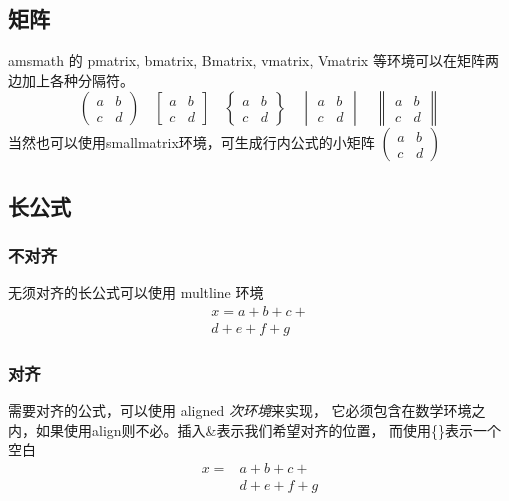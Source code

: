 \subsection{矩阵}
amsmath 的 pmatrix, bmatrix, Bmatrix, vmatrix, Vmatrix 
等环境可以在矩阵两边加上各种分隔符。
\begin{equation*}
\begin{pmatrix} a&b\\c&d \end{pmatrix} \quad
\begin{bmatrix} a&b\\c&d \end{bmatrix} \quad
\begin{Bmatrix} a&b\\c&d \end{Bmatrix} \quad
\begin{vmatrix} a&b\\c&d \end{vmatrix} \quad
\begin{Vmatrix} a&b\\c&d \end{Vmatrix}
\end{equation*}
当然也可以使用smallmatrix环境，可生成行内公式的小矩阵
$ ( \begin{smallmatrix} a&b\\c&d \end{smallmatrix} ) $
\subsection{长公式}
\subsubsection{不对齐}
无须对齐的长公式可以使用 multline 环境
\begin{multline*}
    x = a+b+c+{} \\
    d+e+f+g
\end{multline*}
\subsubsection{对齐}
需要对齐的公式，可以使用 aligned \textit{次环境}来实现，
它必须包含在数学环境之内，如果使用align则不必。插入\&表示我们希望对齐的位置，
而使用\{\}表示一个空白
\begin{equation*} 
    \begin{aligned}
        x ={}&a+b+c+ \\
             &d+e+f+g
    \end{aligned}
\end{equation*}

